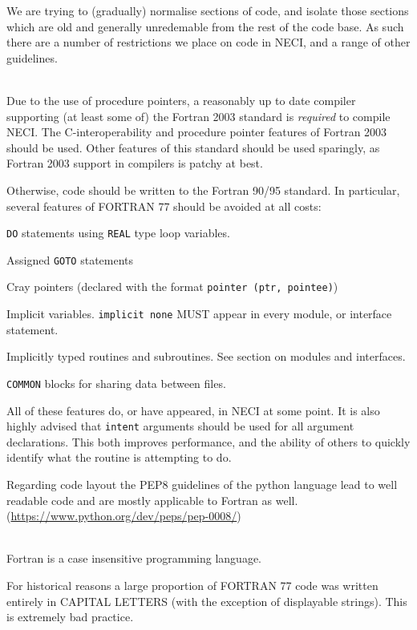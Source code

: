 \documentclass[a4paper,notitlepage]{scrreprt}
\newenvironment{packed_itemize}{
	\begin{itemize}
		\setlength{\itemsep}{1pt}
		\setlength{\parskip}{0pt}
		\setlength{\parsep}{0pt}
	}{\end{itemize}}
\newcommand\headitem[1]{\needspace{1.5\baselineskip}\item[{\boldmath #1 \nopagebreak}] \hfill \\ \nopagebreak}
\let\code\lstinline
\begin{document}
We are trying to (gradually) normalise sections of code, and isolate those
sections which are old and generally unredemable from the rest of the code
base. As such there are a number of restrictions we place on code in NECI,
and a range of other guidelines.

\begin{description}

	\headitem{Fortran standard}
		Due to the use of procedure pointers, a reasonably up to date compiler
		supporting (at least some of) the Fortran 2003 standard is
		\emph{required} to compile NECI. The C-interoperability and procedure
		pointer features of Fortran 2003 should be used. Other features of this
		standard should be used sparingly, as Fortran 2003 support in compilers
		is patchy at best.

		Otherwise, code should be written to the Fortran 90/95 standard. In
		particular, several features of FORTRAN 77 should be avoided at all
		costs:
		\begin{packed_itemize}
			\item
				\code{DO} statements using \code{REAL} type loop
				variables.
			\item Assigned \code{GOTO} statements
			\item
				Cray pointers (declared with the format
				\code{pointer (ptr, pointee)})
			\item
				Implicit variables. \code{implicit none} MUST appear in
				every module, or interface statement.
			\item
				Implicitly typed routines and subroutines. See section on
				modules and interfaces.
			\item
				\code{COMMON} blocks for sharing data between files.
		\end{packed_itemize}
		All of these features do, or have appeared, in NECI at some point.
        It is also highly advised that \code{intent} arguments
        should be used for all argument declarations.
        This both improves performance, and the ability of
        others to quickly identify what the routine is attempting to do.

        Regarding code layout the PEP8 guidelines of the python language
        lead to well readable code and are mostly applicable to Fortran
        as well. (\url{https://www.python.org/dev/peps/pep-0008/})

	\headitem{CAPITAL letters}
		Fortran is a case insensitive programming language.

		For historical reasons a large proportion of FORTRAN 77 code was
		written entirely in CAPITAL LETTERS (with the exception of displayable
		strings). This is extremely bad practice.


\end{description}
\end{document}
